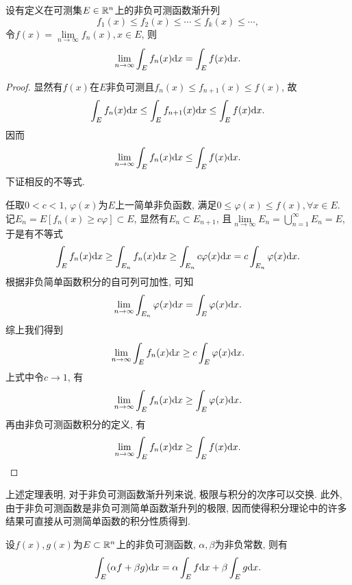 \vskip 0.2cm
\begin{theorem}[Levi非负渐升列积分定理] \label{thm:Levi}
	设有定义在可测集$E \in \mathbb{R}^n$上的非负可测函数渐升列
	$$
		f_1(x) \leq f_2(x) \leq \cdots \leq f_k(x) \leq \cdots,
	$$
	令$f(x) = \lim\limits_{n \to \infty} f_n(x), x \in E$, 则
	\begin{equation}
		\lim\limits_{n \to \infty} \int_E  f_n(x) \mathrm{d} x = \int_E  f(x) \mathrm{d} x.
	\end{equation}
\end{theorem}
\begin{proof}
	显然有$f(x)$在$E$非负可测且$f_n(x) \leq f_{n+1}(x) \leq f(x)$, 故
	$$
		 \int_E  f_n(x) \mathrm{d} x \leq \int_E  f_{n+1}(x) \mathrm{d} x \leq \int_E  f(x) \mathrm{d} x.
	$$
	因而
	$$
		\lim\limits_{n \to \infty} \int_E  f_n(x) \mathrm{d} x \leq \int_E  f(x) \mathrm{d} x.
	$$
	下证相反的不等式. \par 
	任取$0<c<1$, 
	$\varphi(x)$为$E$上一简单非负函数, 满足$0 \leq \varphi(x) \leq f(x), \forall x \in E$. 
	记$E_n = E[f_n(x) \geq c\varphi] \subset E$, 显然有$E_n \subset E_{n+1}$, 
	且$\lim\limits_{n \to \infty} E_n = \bigcup\limits_{n=1}^{\infty} E_n = E$, 于是有不等式
	$$
		\int_E f_n(x) \mathrm{d} x \geq \int_{E_n} f_n(x) \mathrm{d} x \geq \int_{E_n} c \varphi(x) \mathrm{d} x = c\int_{E_n} \varphi(x) \mathrm{d} x.
	$$
	根据非负简单函数积分的自可列可加性, 可知
	$$
		\lim\limits_{n \to \infty} \int_{E_n} \varphi(x) \mathrm{d} x = \int_E \varphi(x) \mathrm{d} x .
	$$
	综上我们得到
	$$
		\lim\limits_{n \to \infty} \int_E f_n(x) \mathrm{d} x \geq c \int_E \varphi(x) \mathrm{d} x .
	$$
	上式中令$c \to 1$, 有
	$$
		\lim\limits_{n \to \infty} \int_E f_n(x) \mathrm{d} x \geq \int_E \varphi(x) \mathrm{d} x .
	$$
	再由非负可测函数积分的定义, 有
	$$
		\lim\limits_{n \to \infty} \int_E  f_n(x) \mathrm{d} x \geq \int_E  f(x) \mathrm{d} x.
	$$
\end{proof}

上述定理表明, 对于非负可测函数渐升列来说, 极限与积分的次序可以交换. 
此外, 由于非负可测函数是非负可测简单函数渐升列的极限, 因而使得积分理论中的许多结果可直接从可测简单函数的积分性质得到. 

\vskip 0.2cm
\begin{theorem}[非负可测函数积分的线性性]
	设$f(x),g(x)$为$E \subset \mathbb{R}^n$上的非负可测函数, 
	$\alpha,\beta$为非负常数, 则有
	\begin{equation}
		 \int_E (\alpha f + \beta g) \mathrm{d} x = \alpha \int_E f \mathrm{d} x + \beta \int_E g \mathrm{d} x.
	\end{equation}
\end{theorem}

